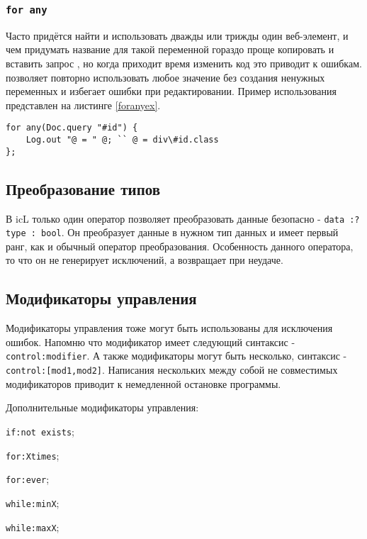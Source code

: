 \subsubsection{\lstinline|for any|}

Часто придётся найти и использовать дважды или трижды один веб-элемент, и чем придумать название для такой переменной гораздо проще копировать и вставить запрос , но когда приходит время изменить код это приводит к ошибкам.  позволяет повторно использовать любое значение без создания ненужных переменных и избегает ошибки при редактировании. Пример использования представлен на листинге \ref{foranyex}.

\begin{lstlisting}[caption=Использование for any, label=foranyex]
for any(Doc.query "#id") {
	Log.out "@ = " @; `` @ = div\#id.class
};
\end{lstlisting}

\subsection{Преобразование типов}

В icL только один оператор позволяет преобразовать данные безопасно - \lstinline|data :? type : bool|.
Он преобразует данные в нужном тип данных и имеет первый ранг, как и обычный оператор преобразования. Особенность данного оператора, то что он не генерирует исключений, а возвращает \void{} при неудаче.

\subsection{Модификаторы управления}

Модификаторы управления тоже могут быть использованы для исключения ошибок. Напомню что модификатор имеет следующий синтаксис - \lstinline|control:modifier|. А также модификаторы могут быть несколько, синтаксис - \lstinline|control:[mod1,mod2]|. Написания нескольких между собой не совместимых модификаторов приводит к немедленной остановке программы.

Дополнительные модификаторы управления:
\begin{icItems}
	\item \lstinline|if:not exists|;
	\item \lstinline|for:Xtimes|;
	\item \lstinline|for:ever|;
	\item \lstinline|while:minX|;
	\item \lstinline|while:maxX|;
\end{icItems}

